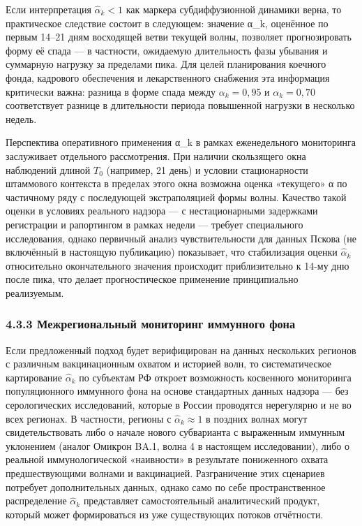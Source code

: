 \documentclass[12pt]{article}
\begin{document}
Если интерпретация \(\hat{\alpha}_k < 1\) как маркера субдиффузионной
динамики верна, то практическое следствие состоит в следующем: значение
α\_k, оценённое по первым 14--21 дням восходящей ветви текущей волны,
позволяет прогнозировать форму её спада --- в частности, ожидаемую
длительность фазы убывания и суммарную нагрузку за пределами пика. Для
целей планирования коечного фонда, кадрового обеспечения и
лекарственного снабжения эта информация критически важна: разница в
форме спада между \(\alpha_k = 0{,}95\) и \(\alpha_k = 0{,}70\)
соответствует разнице в длительности периода повышенной нагрузки в
несколько недель.

Перспектива оперативного применения α\_k в рамках еженедельного
мониторинга заслуживает отдельного рассмотрения. При наличии скользящего
окна наблюдений длиной \(T_0\) (например, 21 день) и условии
стационарности штаммового контекста в пределах этого окна возможна
оценка «текущего» α по частичному ряду с последующей экстраполяцией
формы волны. Качество такой оценки в условиях реального надзора --- с
нестационарными задержками регистрации и рапортингом в рамках недели ---
требует специального исследования, однако первичный анализ
чувствительности для данных Пскова (не включённый в настоящую
публикацию) показывает, что стабилизация оценки \(\hat{\alpha}_k\)
относительно окончательного значения происходит приблизительно к 14-му
дню после пика, что делает прогностическое применение принципиально
реализуемым.

\subsubsection{4.3.3 Межрегиональный мониторинг иммунного
фона}\label{ux43cux435ux436ux440ux435ux433ux438ux43eux43dux430ux43bux44cux43dux44bux439-ux43cux43eux43dux438ux442ux43eux440ux438ux43dux433-ux438ux43cux43cux443ux43dux43dux43eux433ux43e-ux444ux43eux43dux430}

Если предложенный подход будет верифицирован на данных нескольких
регионов с различным вакцинационным охватом и историей волн, то
систематическое картирование \(\hat{\alpha}_k\) по субъектам РФ откроет
возможность косвенного мониторинга популяционного иммунного фона на
основе стандартных данных надзора --- без серологических исследований,
которые в России проводятся нерегулярно и не во всех регионах. В
частности, регионы с \(\hat{\alpha}_k \approx 1\) в поздних волнах могут
свидетельствовать либо о начале нового субварианта с выраженным иммунным
уклонением (аналог Омикрон BA.1, волна 4 в настоящем исследовании), либо
о реальной иммунологической «наивности» в результате пониженного охвата
предшествующими волнами и вакцинацией. Разграничение этих сценариев
потребует дополнительных данных, однако само по себе пространственное
распределение \(\hat{\alpha}_k\) представляет самостоятельный
аналитический продукт, который может формироваться из уже существующих
потоков отчётности.
\end{document}
